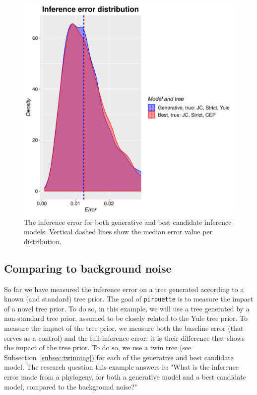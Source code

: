 \begin{figure}[H]
  \includegraphics[width=\textwidth]{example_2/errors.png}
  \caption{
    The inference error for both generative and best candidate inference models.
    Vertical dashed lines show the median error value per distribution.
  }
  \label{fig:example_2}
\end{figure}

\subsection{Comparing to background noise}\label{Comparing to background noise}

So far we have measured the inference error on a tree
generated according to a known (and standard) tree prior. 
The goal of \verb;pirouette; is to measure the impact of a novel tree prior.
To do so, in this example, we will use a tree generated by a non-standard 
tree prior, assumed to be closely related to the Yule tree prior.
To measure the impact of the tree prior, we measure both the baseline 
error (that serves as a control) and the full inference error: it is their 
difference that shows the impact of the tree prior.
To do so, we use a twin tree (see Subsection~\ref{subsec:twinning}) for 
each of the generative and best candidate model.
The research question this example answers is:
"What is the inference error made from a phylogeny, 
for both a generative model and a best candidate model, compared to the 
background noise?"

